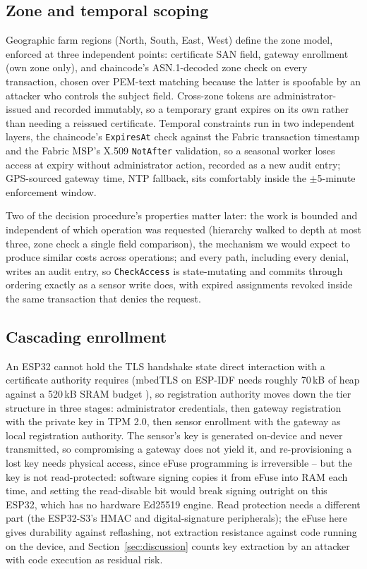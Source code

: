 \subsection{Zone and temporal scoping}

Geographic farm regions (North, South, East, West) define the zone model, enforced at three independent points: certificate SAN field, gateway enrollment (own zone only), and chaincode's ASN.1-decoded zone check on every transaction, chosen over PEM-text matching because the latter is spoofable by an attacker who controls the subject field. Cross-zone tokens are administrator-issued and recorded immutably, so a temporary grant expires on its own rather than needing a reissued certificate. Temporal constraints run in two independent layers, the chaincode's \texttt{ExpiresAt} check against the Fabric transaction timestamp and the Fabric MSP's X.509 \texttt{NotAfter} validation, so a seasonal worker loses access at expiry without administrator action, recorded as a new audit entry; GPS-sourced gateway time, NTP fallback, sits comfortably inside the $\pm$5-minute enforcement window.

Two of the decision procedure's properties matter later: the work is bounded and independent of which operation was requested (hierarchy walked to depth at most three, zone check a single field comparison), the mechanism we would expect to produce similar costs across operations; and every path, including every denial, writes an audit entry, so \texttt{CheckAccess} is state-mutating and commits through ordering exactly as a sensor write does, with expired assignments revoked inside the same transaction that denies the request.

\subsection{Cascading enrollment}

An ESP32 cannot hold the TLS handshake state direct interaction with a certificate authority requires (mbedTLS on ESP-IDF needs roughly 70\,kB of heap against a 520\,kB SRAM budget \citep{raza2013lithe}), so registration authority moves down the tier structure in three stages: administrator credentials, then gateway registration with the private key in TPM 2.0, then sensor enrollment with the gateway as local registration authority. The sensor's key is generated on-device and never transmitted, so compromising a gateway does not yield it, and re-provisioning a lost key needs physical access, since eFuse programming is irreversible -- but the key is not read-protected: software signing copies it from eFuse into RAM each time, and setting the read-disable bit would break signing outright on this ESP32, which has no hardware Ed25519 engine. Read protection needs a different part (the ESP32-S3's HMAC and digital-signature peripherals); the eFuse here gives durability against reflashing, not extraction resistance against code running on the device, and Section~\ref{sec:discussion} counts key extraction by an attacker with code execution as residual risk.
